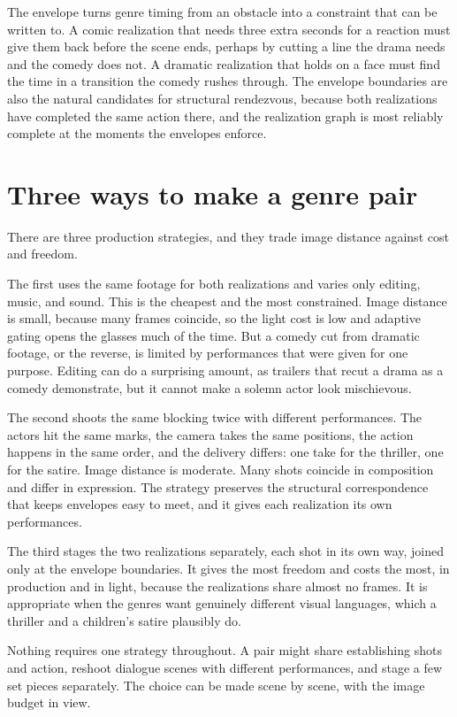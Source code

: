The envelope turns genre timing from an obstacle into a constraint that can be written to. A comic realization that needs three extra seconds for a reaction must give them back before the scene ends, perhaps by cutting a line the drama needs and the comedy does not. A dramatic realization that holds on a face must find the time in a transition the comedy rushes through. The envelope boundaries are also the natural candidates for structural rendezvous, because both realizations have completed the same action there, and the realization graph is most reliably complete at the moments the envelopes enforce.

\section{Three ways to make a genre pair}

There are three production strategies, and they trade image distance against cost and freedom.

The first uses the same footage for both realizations and varies only editing, music, and sound. This is the cheapest and the most constrained. Image distance is small, because many frames coincide, so the light cost is low and adaptive gating opens the glasses much of the time. But a comedy cut from dramatic footage, or the reverse, is limited by performances that were given for one purpose. Editing can do a surprising amount, as trailers that recut a drama as a comedy demonstrate, but it cannot make a solemn actor look mischievous.

The second shoots the same blocking twice with different performances. The actors hit the same marks, the camera takes the same positions, the action happens in the same order, and the delivery differs: one take for the thriller, one for the satire. Image distance is moderate. Many shots coincide in composition and differ in expression. The strategy preserves the structural correspondence that keeps envelopes easy to meet, and it gives each realization its own performances.

The third stages the two realizations separately, each shot in its own way, joined only at the envelope boundaries. It gives the most freedom and costs the most, in production and in light, because the realizations share almost no frames. It is appropriate when the genres want genuinely different visual languages, which a thriller and a children's satire plausibly do.

Nothing requires one strategy throughout. A pair might share establishing shots and action, reshoot dialogue scenes with different performances, and stage a few set pieces separately. The choice can be made scene by scene, with the image budget in view.

